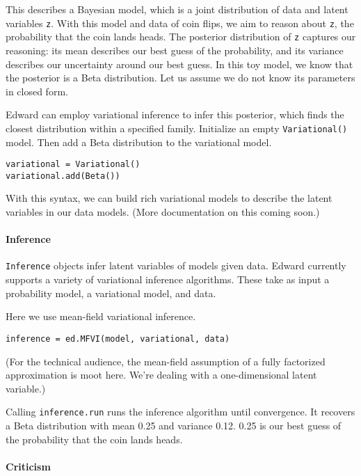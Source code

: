 This describes a Bayesian model, which is a joint distribution of data
and latent variables \texttt{z}. With this model and data of coin flips,
we aim to reason about \texttt{z}, the probability that the coin lands
heads. The posterior distribution of \texttt{z} captures our reasoning:
its mean describes our best guess of the probability, and its variance
describes our uncertainty around our best guess. In this toy model, we
know that the posterior is a Beta distribution. Let us assume we do not
know its parameters in closed form.

Edward can employ variational inference to infer this posterior, which
finds the closest distribution within a specified family. Initialize an
empty \texttt{Variational()} model. Then add a Beta distribution to the
variational model.

\begin{verbatim}
variational = Variational()
variational.add(Beta())
\end{verbatim}

With this syntax, we can build rich variational models to describe the
latent variables in our data models. (More documentation on this coming
soon.)

\paragraph{Inference}\label{inference}

\texttt{Inference} objects infer latent variables of models given data.
Edward currently supports a variety of variational inference algorithms.
These take as input a probability model, a variational model, and data.

Here we use mean-field variational inference.

\begin{verbatim}
inference = ed.MFVI(model, variational, data)
\end{verbatim}

(For the technical audience, the mean-field assumption of a fully
factorized approximation is moot here. We're dealing with a
one-dimensional latent variable.)

Calling \texttt{inference.run} runs the inference algorithm until
convergence. It recovers a Beta distribution with mean 0.25 and variance
0.12. 0.25 is our best guess of the probability that the coin lands
heads.

\paragraph{Criticism}\label{criticism}

